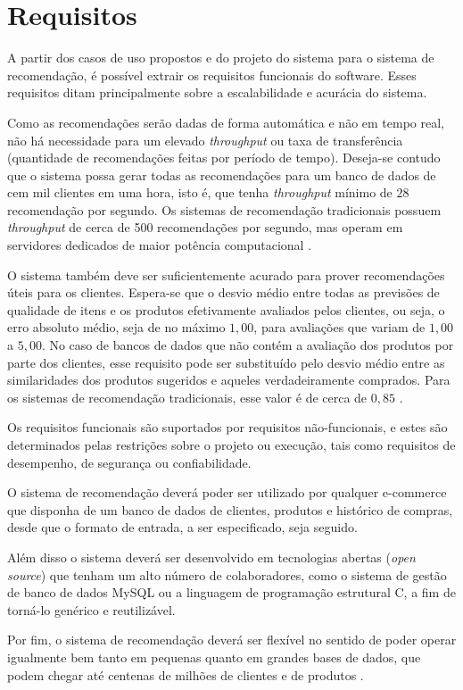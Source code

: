 \chapter[Requisitos]{Requisitos}
\label{chap:requisitos}

A partir dos casos de uso propostos e do projeto do sistema para o sistema de recomendação, é possível extrair os requisitos funcionais do software. Esses requisitos ditam principalmente sobre a escalabilidade e acurácia do sistema.

Como as recomendações serão dadas de forma automática e não em tempo real, não há necessidade para um elevado \textit{throughput} ou taxa de transferência (quantidade de recomendações feitas por período de tempo). Deseja-se contudo que o sistema possa gerar todas as recomendações para um banco de dados de cem mil clientes em uma hora, isto é, que tenha \textit{throughput} mínimo de $28$ recomendação por segundo. Os sistemas de recomendação tradicionais possuem \textit{throughput} de cerca de 500 recomendações por segundo, mas operam em servidores dedicados de maior potência computacional \cite{sarwar2001item}.  

O sistema também deve ser suficientemente acurado para prover recomendações úteis para os clientes. Espera-se que o desvio médio entre todas as previsões de qualidade de itens e os produtos efetivamente avaliados pelos clientes, ou seja, o erro absoluto médio, seja de no máximo $1,00$, para avaliações que variam de $1,00$ a $5,00$. No caso de bancos de dados que não contém a avaliação dos produtos por parte dos clientes, esse requisito pode ser substituído pelo desvio médio entre as similaridades dos produtos sugeridos e aqueles verdadeiramente comprados. Para os sistemas de recomendação tradicionais, esse valor é de cerca de $0,85$ \cite{sarwar2002recommender}.

Os requisitos funcionais são suportados por requisitos não-funcionais, e estes são determinados pelas restrições sobre o projeto ou execução, tais como requisitos de desempenho, de segurança ou confiabilidade. 

O sistema de recomendação deverá poder ser utilizado por qualquer e-commerce que disponha de um banco de dados de clientes, produtos e histórico de compras, desde que o formato de entrada, a ser especificado, seja seguido.

Além disso o sistema deverá ser desenvolvido em tecnologias abertas (\textit{open source}) que tenham um alto número de colaboradores, como o sistema de gestão de banco de dados MySQL ou a linguagem de programação estrutural C, a fim de torná-lo genérico e reutilizável.

Por fim, o sistema de recomendação deverá ser flexível no sentido de poder operar igualmente bem tanto em pequenas quanto em grandes bases de dados, que podem chegar até centenas de milhões de clientes \cite{amazoncustomers} e de produtos \cite{amazonproducts}.